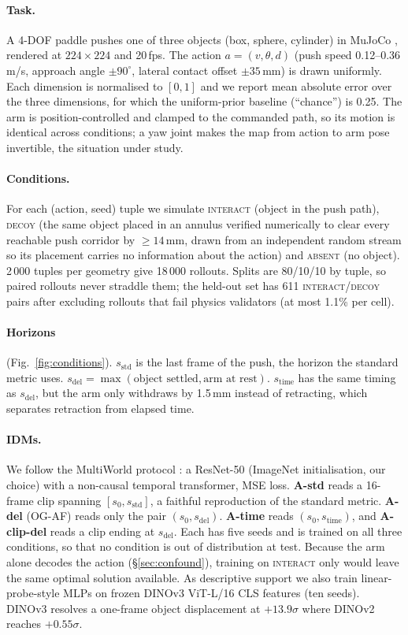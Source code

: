 \documentclass[10pt]{article}
\newcommand{\sstd}{s_{\mathrm{std}}}
\newcommand{\sdel}{s_{\mathrm{del}}}
\newcommand{\stime}{s_{\mathrm{time}}}
\newcommand{\cond}[1]{\textsc{#1}}
\begin{document}
\paragraph{Task.} A 4-DOF paddle pushes one of three objects (box, sphere, cylinder)
in MuJoCo \citep{todorov2012mujoco}, rendered at $224\times224$ and 20\,fps. The action
$a=(v,\theta,d)$ (push speed 0.12--0.36\,m/s, approach angle $\pm90^\circ$, lateral
contact offset $\pm35$\,mm) is drawn uniformly. Each dimension is normalised to $[0,1]$
and we report mean absolute error over the three dimensions, for which the
uniform-prior baseline (``chance'') is 0.25. The arm is position-controlled and clamped
to the commanded path, so its motion is identical across conditions; a yaw joint makes
the map from action to arm pose invertible, the situation under study.

\paragraph{Conditions.} For each (action, seed) tuple we simulate \cond{interact} (object
in the push path), \cond{decoy} (the same object placed in an annulus verified
numerically to clear every reachable push corridor by $\geq14$\,mm, drawn from an
independent random stream so its placement carries no information about the action)
and \cond{absent} (no object). 2\,000 tuples per geometry give 18\,000 rollouts. Splits
are 80/10/10 by tuple, so paired rollouts never straddle them; the held-out set has 611
\cond{interact}/\cond{decoy} pairs after excluding rollouts that fail physics
validators (at most 1.1\% per cell).

\paragraph{Horizons} (Fig.~\ref{fig:conditions}). $\sstd$ is the last frame of the push,
the horizon the standard metric uses. $\sdel=\max(\text{object settled},\text{arm at
rest})$. $\stime$ has the same timing as $\sdel$, but the arm only withdraws by 1.5\,mm
instead of retracting, which separates retraction from elapsed time.

\paragraph{IDMs.} We follow the MultiWorld protocol \citep{multiworld2026}: a
ResNet-50 (ImageNet initialisation, our choice) with a non-causal temporal transformer,
MSE loss. \textbf{A-std} reads a 16-frame clip spanning $[s_0,\sstd]$, a faithful
reproduction of the standard metric. \textbf{A-del} (OG-AF) reads only the pair
$(s_0,\sdel)$. \textbf{A-time} reads $(s_0,\stime)$, and \textbf{A-clip-del} reads a
clip ending at $\sdel$. Each has five seeds and is trained on all three conditions, so
that no condition is out of distribution at test. Because the arm alone decodes the
action (\S\ref{sec:confound}), training on \cond{interact} only would leave the same
optimal solution available. As descriptive support we also train linear-probe-style
MLPs on frozen DINOv3 ViT-L/16 CLS features \citep{simeoni2025dinov3} (ten seeds).
DINOv3 resolves a one-frame object displacement at $+13.9\sigma$ where DINOv2
\citep{oquab2023dinov2} reaches $+0.55\sigma$.
\end{document}

